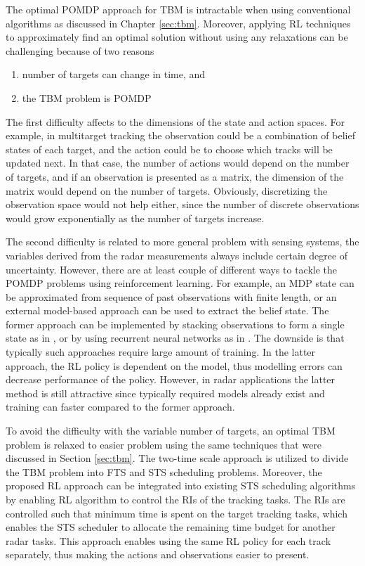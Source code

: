 \documentclass[english, 12pt, a4paper, elec, utf8, a-1b, online]{aaltothesis}
\begin{document}
The optimal POMDP approach for TBM is intractable when using conventional algorithms as discussed in Chapter \ref{sec:tbm}. 
Moreover, applying RL techniques to approximately find an optimal solution without using any relaxations can be challenging because of two reasons
\begin{enumerate}
    \item number of targets can change in time, and
    \item the TBM problem is POMDP
\end{enumerate}
The first difficulty affects to the dimensions of the state and action spaces. 
For example, in multitarget tracking the observation could be a combination of belief states of each target, and the action could be to choose which tracks will be updated next.
In that case, the number of actions would depend on the number of targets, and if an observation is presented as a matrix, the dimension of the matrix would depend on the number of targets.
Obviously, discretizing the observation space would not help either, since the number of discrete observations would grow exponentially as the number of targets increase.

The second difficulty is related to more general problem with sensing systems,
the variables derived from the radar measurements always include certain degree of uncertainty.
However, there are at least couple of different ways to tackle the POMDP problems using reinforcement learning.
For example, an MDP state can be approximated from sequence of past observations with finite length, or an external model-based approach can be used to extract the belief state.
The former approach can be implemented by stacking observations to form a single state as in \cite{Mnih2013}, or by using recurrent neural networks as in \cite{Hausknecht2015}.
The downside is that typically such approaches require large amount of training.
In the latter approach, the RL policy is dependent on the model, thus modelling errors can decrease performance of the policy.
However, in radar applications the latter method is still attractive since typically required models already exist and training can faster compared to the former approach.

To avoid the difficulty with the variable number of targets, an optimal TBM problem is relaxed to easier problem using the same techniques that were discussed in Section \ref{sec:tbm}.
The two-time scale approach is utilized to divide the TBM problem into FTS and STS scheduling problems.
Moreover, the proposed RL approach can be integrated into existing STS scheduling algorithms by enabling RL algorithm to control the RIs of the tracking tasks.
The RIs are controlled such that minimum time is spent on the target tracking tasks, which enables the STS scheduler to allocate the remaining time budget for another radar tasks.
This approach enables using the same RL policy for each track separately, thus making the actions and observations easier to present.
\end{document}
